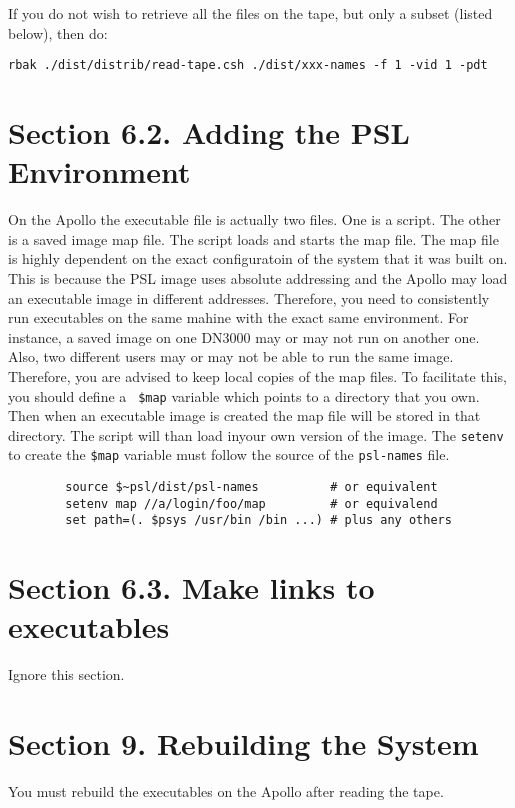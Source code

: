 If you do not wish to retrieve all the files on the tape,
but only a subset (listed below), then do:
\begin{verbatim}
rbak ./dist/distrib/read-tape.csh ./dist/xxx-names -f 1 -vid 1 -pdt
\end{verbatim}

\section{Section 6.2.  Adding the PSL Environment}

On the Apollo the executable file is actually two files.  One is a
script.  The other is a saved image map file.  The script loads and
starts the map file.  The map file is highly dependent on the exact
configuratoin of the system that it was built on.  This is because the
PSL image uses absolute addressing and the Apollo may load an
executable image in different addresses.  Therefore, you need to
consistently run executables on the same mahine with the exact same
environment.  For instance, a saved image on one DN3000 may or may not
run on another one.  Also, two different users may or may not be able
to run the same image.  Therefore, you are advised to keep local
copies of the map files.  To facilitate this, you should define a {\tt
\$map} variable which points to a directory that you own.  Then when
an executable image is created the map file will be stored in that
directory.  The script will than load inyour own version of the image.
The {\tt setenv} to create the {\tt \$map} variable must follow the
source of the {\tt psl-names} file.

\begin{verbatim}
        source $~psl/dist/psl-names          # or equivalent
        setenv map //a/login/foo/map         # or equivalend
        set path=(. $psys /usr/bin /bin ...) # plus any others
\end{verbatim}

\section{Section 6.3.  Make links to executables}

Ignore this section.

\section{Section 9. Rebuilding the System}

You must rebuild the executables on the Apollo after reading the tape.

